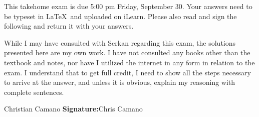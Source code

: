 \documentclass[11pt]{amsart}
\theoremstyle{definition}  %
\begin{document}

\noindent
This takehome exam is due 5:00 pm Friday, September 30. Your answers need to be typeset in \LaTeX \ and uploaded on iLearn. Please also read and sign the following and return it
with your answers.

\vskip 3cm
\noindent While I may have consulted with Serkan regarding this exam, the solutions presented here are my own work. I have
not consulted any books other than the textbook and notes, nor  have I utilized the internet in any form in relation to the exam. I understand
that to get full credit, I need to show all the steps necessary to arrive at the answer, and unless it is obvious, explain
my reasoning with complete sentences.


\vskip 1cm
  Christian Camano \hspace{7cm}   {\bf Signature:}Chris Camano



\vfill
\eject
\end{document}

